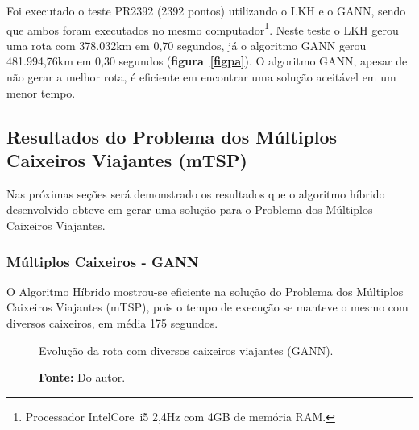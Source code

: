 \documentclass[12pt,openright,a4paper,twoside]{tcc}
\begin{document}
		Foi executado o teste PR2392 (2392 pontos) utilizando o LKH e o GANN, sendo que ambos foram executados no mesmo computador\footnote{Processador Intel\textregistered Core\texttrademark ~i5 2,4Hz com 4GB de memória RAM.}. Neste teste o LKH gerou uma rota com 378.032km em 0,70 segundos, já o algoritmo GANN gerou 481.994,76km em 0,30 segundos (\textbf{figura~\ref{figpa}}).
		O algoritmo GANN, apesar de não gerar a melhor rota, é eficiente em encontrar uma solução aceitável em um menor tempo.

        \newpage
		\subsection{Resultados do Problema dos Múltiplos Caixeiros Viajantes (mTSP)}	

        Nas próximas seções será demonstrado os resultados que o algoritmo híbrido desenvolvido obteve em gerar uma solução para o Problema dos Múltiplos Caixeiros Viajantes.

		\subsubsection{Múltiplos Caixeiros - GANN}
		
		O Algoritmo Híbrido mostrou-se eficiente na solução do Problema dos Múltiplos Caixeiros Viajantes (mTSP), pois o tempo de execução se manteve o mesmo com diversos caixeiros, em média 175 segundos.

		\begin{figure}[h]
			\centering
            \caption{Evolução da rota com diversos caixeiros viajantes (GANN).}
			\caption*{\textbf{Fonte:} Do autor.}
			\label{figmult}
		\end{figure}
\end{document}
